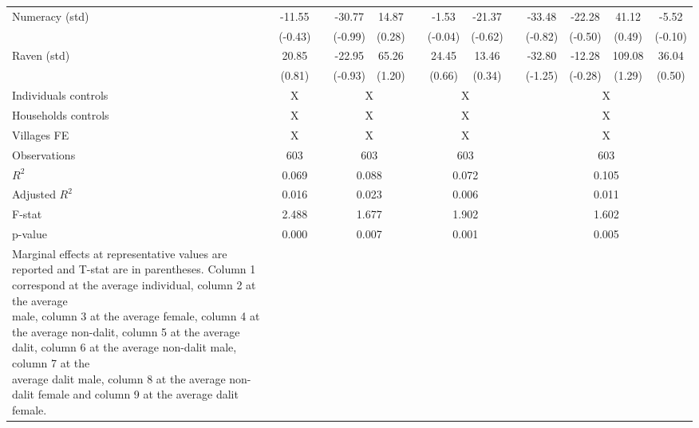 \begin{table}[htbp]
{\begin{tabular}{lcccccccccccc}
    Numeracy (std) & -11.55 &   & -30.77 & 14.87 &   & -1.53 & -21.37 &   & -33.48 & -22.28 & 41.12 & -5.52 \\
      & (-0.43) &   & (-0.99) & (0.28) &   & (-0.04) & (-0.62) &   & (-0.82) & (-0.50) & (0.49) & (-0.10) \\
    Raven (std) & 20.85 &   & -22.95 & 65.26 &   & 24.45 & 13.46 &   & -32.80 & -12.28 & 109.08 & 36.04 \\
      & (0.81) &   & (-0.93) & (1.20) &   & (0.66) & (0.34) &   & (-1.25) & (-0.28) & (1.29) & (0.50) \\
\cmidrule{1-2}\cmidrule{4-5}\cmidrule{7-8}\cmidrule{10-13}   
    Individuals controls & X     &       & \multicolumn{2}{c}{X} &       & \multicolumn{2}{c}{X} &       & \multicolumn{4}{c}{X} \\
    Households controls & X     &       & \multicolumn{2}{c}{X} &       & \multicolumn{2}{c}{X} &       & \multicolumn{4}{c}{X} \\
    Villages FE & X     &       & \multicolumn{2}{c}{X} &       & \multicolumn{2}{c}{X} &       & \multicolumn{4}{c}{X} \\
    \midrule
    Observations & 603   &       & \multicolumn{2}{c}{603} &       & \multicolumn{2}{c}{603} &       & \multicolumn{4}{c}{603} \\
    $R^2$ & 0.069 &       & \multicolumn{2}{c}{0.088} &       & \multicolumn{2}{c}{0.072} &       & \multicolumn{4}{c}{0.105} \\
    Adjusted $R^2$ & 0.016 &       & \multicolumn{2}{c}{0.023} &       & \multicolumn{2}{c}{0.006} &       & \multicolumn{4}{c}{0.011} \\
    F-stat & 2.488 &       & \multicolumn{2}{c}{1.677} &       & \multicolumn{2}{c}{1.902} &       & \multicolumn{4}{c}{1.602} \\
    p-value & 0.000 &       & \multicolumn{2}{c}{0.007} &       & \multicolumn{2}{c}{0.001} &       & \multicolumn{4}{c}{0.005} \\
    \bottomrule
	\Tablenote{13}{
	Marginal effects at representative values are reported and T-stat are in parentheses. Column 1 correspond at the average individual, column 2 at the average \\ 
	male, column 3 at the average female, column 4 at the average non-dalit, column 5 at the average dalit, column 6 at the average non-dalit male, column 7 at the \\ 
	average dalit male, column 8 at the average non-dalit female and column 9 at the average dalit female.} \\
    \end{tabular}%
	}
  \label{tab:ame_idsr}%
\end{table}%

